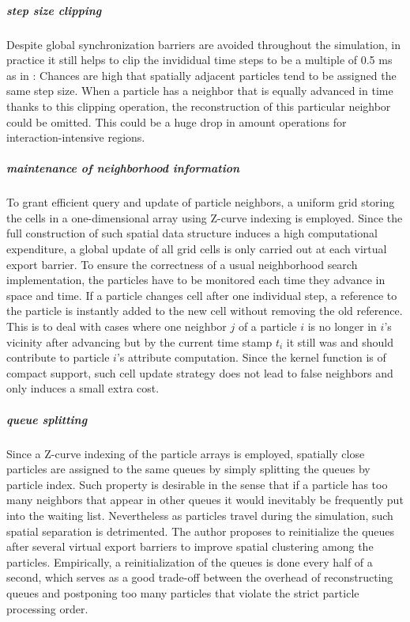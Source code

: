 \documentclass[
	11pt, 
	DIV10,
	ngerman,
	a4paper, 
	oneside, 
	headings=normal, 
	captions=tableheading,
	final, 
	numbers=noenddot
]{scrartcl}
\begin{document}
\subparagraph{step size clipping}
Despite global synchronization barriers are avoided throughout the simulation, in practice it still helps to clip the invididual time steps to be a multiple of 0.5 ms as in \cite{goswami2014regional}: Chances are high that spatially adjacent particles tend to be assigned the same step size. When a particle has a neighbor that is equally advanced in time thanks to this clipping operation, the reconstruction of this particular neighbor could be omitted. This could be a huge drop in amount operations for interaction-intensive regions.

\subparagraph{maintenance of neighborhood information}
To grant efficient query and update of particle neighbors, a uniform grid storing the cells in a one-dimensional array using Z-curve indexing is employed. Since the full construction of such spatial data structure induces a high computational expenditure, a global update of all grid cells is only carried out at each virtual export barrier. To ensure the correctness of a usual neighborhood search implementation, the particles have to be monitored each time they advance in space and time. If a particle changes cell after one individual step, a reference to the particle is instantly added to the new cell without removing the old reference. This is to deal with cases where one neighbor $j$ of a particle $i$ is no longer in $i$'s vicinity after advancing but by the current time stamp $t_{i}$ it still was and should contribute to particle $i$'s attribute computation. Since the kernel function is of compact support, such cell update strategy does not lead to false neighbors and only induces a small extra cost.

\subparagraph{queue splitting}
Since a Z-curve indexing of the particle arrays is employed, spatially close particles are assigned to the same queues by simply splitting the queues by particle index. Such property is desirable in the sense that if a particle has too many neighbors that appear in other queues it would inevitably be frequently put into the waiting list. Nevertheless as particles travel during the simulation, such spatial separation is detrimented. The author proposes to reinitialize the queues after several virtual export barriers to improve spatial clustering among the particles. Empirically, a reinitialization of the queues is done every half of a second, which serves as a good trade-off between the overhead of reconstructing queues and postponing too many particles that violate the strict particle processing order.
\end{document}
